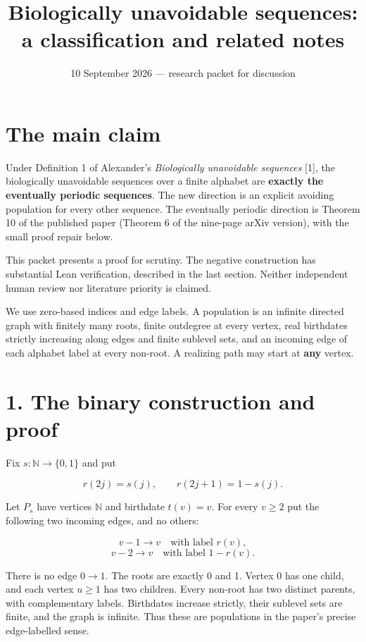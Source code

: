 \documentclass[
  11pt,
]{article}
\title{Biologically unavoidable sequences: a classification and related
notes}
\author{}
\date{10 September 2026 --- research packet for discussion}
\begin{document}
\maketitle

\section{The main claim}\label{the-main-claim}

Under Definition 1 of Alexander's \emph{Biologically unavoidable
sequences} {[}1{]}, the biologically unavoidable sequences over a finite
alphabet are \textbf{exactly the eventually periodic sequences}. The new
direction is an explicit avoiding population for every other sequence.
The eventually periodic direction is Theorem 10 of the published paper
(Theorem 6 of the nine-page arXiv version), with the small proof repair
below.

This packet presents a proof for scrutiny. The negative construction has
substantial Lean verification, described in the last section. Neither
independent human review nor literature priority is claimed.

We use zero-based indices and edge labels. A population is an infinite
directed graph with finitely many roots, finite outdegree at every
vertex, real birthdates strictly increasing along edges and finite
sublevel sets, and an incoming edge of each alphabet label at every
non-root. A realizing path may start at \textbf{any} vertex.

\section{1. The binary construction and
proof}\label{the-binary-construction-and-proof}

Fix \(s:\mathbb N\to\{0,1\}\) and put

\[r(2j)=s(j),\qquad r(2j+1)=1-s(j).\]

Let \(P_s\) have vertices \(\mathbb N\) and birthdate \(t(v)=v\). For
every \(v\ge2\) put the following two incoming edges, and no others:

\[v-1\longrightarrow v\quad\text{with label }r(v),\]
\[v-2\longrightarrow v\quad\text{with label }1-r(v).\]

There is no edge \(0\to1\). The roots are exactly 0 and 1. Vertex 0 has
one child, and each vertex \(u\ge1\) has two children. Every non-root
has two distinct parents, with complementary labels. Birthdates increase
strictly, their sublevel sets are finite, and the graph is infinite.
Thus these are populations in the paper's precise edge-labelled sense.
\end{document}
